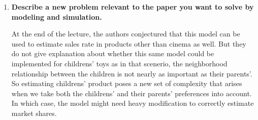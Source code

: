 \documentclass[article, 11pt, a4paper]{memoir}
\begin{document}
\begin{enumerate}[left=0pt, itemsep=20pt, label={\(\square\)}]
    \item \textbf{Describe a new problem relevant to the paper you want to solve by
        modeling and simulation.}

        At the end of the lecture, the authors conjectured that this model can be used to
        estimate sales rate in products other than cinema as well. But they do not give
        explanation about whether this same model could be implemented for childrens' toys
        as in that scenerio, the neighborhood relationship between the children is not
        nearly as important as their parents'. So estimating childrens' product poses a
        new set of complexity that arises when we take both the childrens' and their
        parents' preferences into account. In which case, the model might need heavy
        modification to correctly estimate market shares.

\end{enumerate}
\end{document}
